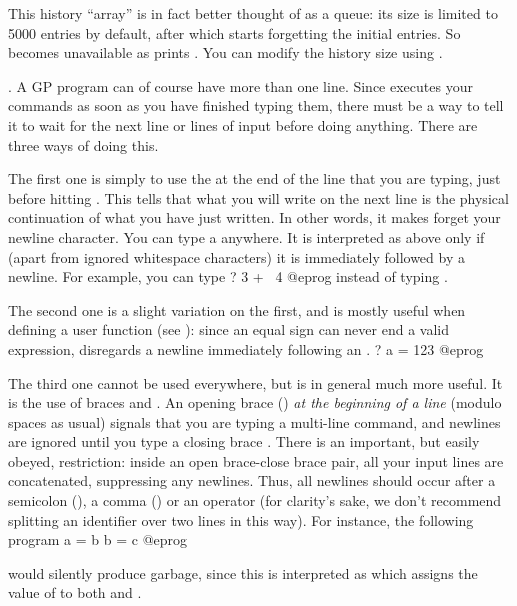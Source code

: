 This history ``array'' is in fact better thought of as a queue: its size is
limited to 5000 entries by default, after which  starts forgetting
the initial entries. So  becomes unavailable as  prints
. You can modify the history size using .

. A GP program
can of course have more than one line. Since  executes your commands as
soon as you have finished typing them, there must be a way to tell it to
wait for the next line or lines of input before doing anything. There are
three ways of doing this.

The first one is simply to use the  \kbd{\bs} at the
end of the line that you are typing, just before hitting . This
tells  that what you will write on the next line is the physical
continuation of what you have just written. In other words, it makes 
forget your newline character. You can type a \kbd{\bs} anywhere. It is
interpreted as above only if (apart from ignored whitespace characters) it is
immediately followed by a newline. For example, you can type
\bprog
? 3 + \
4
@eprog
\noindent instead of typing .

The second one is a slight variation on the first, and is mostly useful when
defining a user function (see \secref{se:user_defined}): since an equal sign
can never end a valid expression, \kbd{gp} disregards a newline immediately
following an \kbd{=}.
\bprog
? a =
123
@eprog

The third one cannot be used everywhere, but is in general much more useful.
It is the use of braces \kbd{\obr} and  \kbd{\cbr}.\sidx{brace characters}
An opening brace (\kbd{\obr}) \emph{at the beginning of a line}
(modulo spaces as usual) signals that you are typing a multi-line
command, and newlines are ignored until you type a closing brace
\kbd{\cbr}. There is an important, but easily obeyed, restriction:
inside an open brace-close brace pair, all your input lines are
concatenated, suppressing any newlines. Thus, all newlines should occur after
a semicolon (\kbd{;}), a comma (\kbd{,}) or an operator (for clarity's sake,
we don't recommend splitting an identifier over two lines in this way). For
instance, the following program
\bprog
{
  a = b
  b = c
}
@eprog

\noindent would silently produce garbage, since this is interpreted as
\kbd{a=bb=c} which assigns the value of \kbd{c} to both \kbd{bb} and
\kbd{a}.

